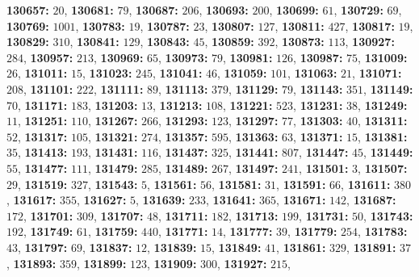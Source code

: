 \textsf{\bfseries 130657:} $20$, \textsf{\bfseries 130681:} $79$, \textsf{\bfseries 130687:} $206$, \textsf{\bfseries 130693:} $200$, \textsf{\bfseries 130699:} $61$, \textsf{\bfseries 130729:} $69$, \textsf{\bfseries 130769:} $1001$, \textsf{\bfseries 130783:} $19$, \textsf{\bfseries 130787:} $23$, \textsf{\bfseries 130807:} $127$, \textsf{\bfseries 130811:} $427$, \textsf{\bfseries 130817:} $19$, \textsf{\bfseries 130829:} $310$, \textsf{\bfseries 130841:} $129$, \textsf{\bfseries 130843:} $45$, \textsf{\bfseries 130859:} $392$, \textsf{\bfseries 130873:} $113$, \textsf{\bfseries 130927:} $284$, \textsf{\bfseries 130957:} $213$, \textsf{\bfseries 130969:} $65$, \textsf{\bfseries 130973:} $79$, \textsf{\bfseries 130981:} $126$, \textsf{\bfseries 130987:} $75$, \textsf{\bfseries 131009:} $26$, \textsf{\bfseries 131011:} $15$, \textsf{\bfseries 131023:} $245$, \textsf{\bfseries 131041:} $46$, \textsf{\bfseries 131059:} $101$, \textsf{\bfseries 131063:} $21$, \textsf{\bfseries 131071:} $208$, \textsf{\bfseries 131101:} $222$, \textsf{\bfseries 131111:} $89$, \textsf{\bfseries 131113:} $379$, \textsf{\bfseries 131129:} $79$, \textsf{\bfseries 131143:} $351$, \textsf{\bfseries 131149:} $70$, \textsf{\bfseries 131171:} $183$, \textsf{\bfseries 131203:} $13$, \textsf{\bfseries 131213:} $108$, \textsf{\bfseries 131221:} $523$, \textsf{\bfseries 131231:} $38$, \textsf{\bfseries 131249:} $11$, \textsf{\bfseries 131251:} $110$, \textsf{\bfseries 131267:} $266$, \textsf{\bfseries 131293:} $123$, \textsf{\bfseries 131297:} $77$, \textsf{\bfseries 131303:} $40$, \textsf{\bfseries 131311:} $52$, \textsf{\bfseries 131317:} $105$, \textsf{\bfseries 131321:} $274$, \textsf{\bfseries 131357:} $595$, \textsf{\bfseries 131363:} $63$, \textsf{\bfseries 131371:} $15$, \textsf{\bfseries 131381:} $35$, \textsf{\bfseries 131413:} $193$, \textsf{\bfseries 131431:} $116$, \textsf{\bfseries 131437:} $325$, \textsf{\bfseries 131441:} $807$, \textsf{\bfseries 131447:} $45$, \textsf{\bfseries 131449:} $55$, \textsf{\bfseries 131477:} $111$, \textsf{\bfseries 131479:} $285$, \textsf{\bfseries 131489:} $267$, \textsf{\bfseries 131497:} $241$, \textsf{\bfseries 131501:} $3$, \textsf{\bfseries 131507:} $29$, \textsf{\bfseries 131519:} $327$, \textsf{\bfseries 131543:} $5$, \textsf{\bfseries 131561:} $56$, \textsf{\bfseries 131581:} $31$, \textsf{\bfseries 131591:} $66$, \textsf{\bfseries 131611:} $380$, \textsf{\bfseries 131617:} $355$, \textsf{\bfseries 131627:} $5$, \textsf{\bfseries 131639:} $233$, \textsf{\bfseries 131641:} $365$, \textsf{\bfseries 131671:} $142$, \textsf{\bfseries 131687:} $172$, \textsf{\bfseries 131701:} $309$, \textsf{\bfseries 131707:} $48$, \textsf{\bfseries 131711:} $182$, \textsf{\bfseries 131713:} $199$, \textsf{\bfseries 131731:} $50$, \textsf{\bfseries 131743:} $192$, \textsf{\bfseries 131749:} $61$, \textsf{\bfseries 131759:} $440$, \textsf{\bfseries 131771:} $14$, \textsf{\bfseries 131777:} $39$, \textsf{\bfseries 131779:} $254$, \textsf{\bfseries 131783:} $43$, \textsf{\bfseries 131797:} $69$, \textsf{\bfseries 131837:} $12$, \textsf{\bfseries 131839:} $15$, \textsf{\bfseries 131849:} $41$, \textsf{\bfseries 131861:} $329$, \textsf{\bfseries 131891:} $37$, \textsf{\bfseries 131893:} $359$, \textsf{\bfseries 131899:} $123$, \textsf{\bfseries 131909:} $300$, \textsf{\bfseries 131927:} $215$, 
